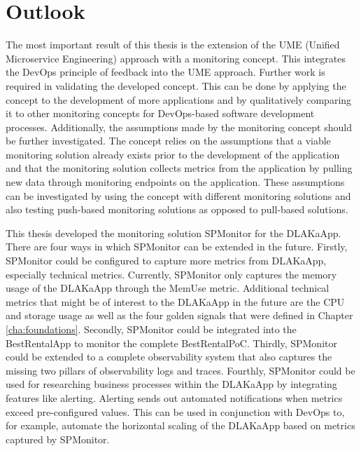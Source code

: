 \section{Outlook}
\label{sec:outlook}

The most important result of this thesis is the extension of the UME (Unified Microservice Engineering)
approach with a monitoring concept. This integrates the DevOps principle of feedback
into the UME approach. Further work is required in validating the developed concept.
This can be done by applying the concept to the development of more applications
and by qualitatively comparing it to other monitoring concepts for DevOps-based
software development processes. Additionally, the assumptions made by the monitoring concept
should be further investigated. The concept relies on the assumptions that a viable monitoring
solution already exists prior to the development of the application
and that the monitoring solution collects metrics from the application by pulling new data
through monitoring endpoints on the application. These assumptions can be investigated by
using the concept with different monitoring solutions and also testing push-based monitoring solutions
as opposed to pull-based solutions.

This thesis developed the monitoring solution SPMonitor
for the DLAKaApp. There are four ways in which SPMonitor
can be extended in the future. Firstly, SPMonitor could be configured
to capture more metrics from DLAKaApp, especially technical metrics.
Currently, SPMonitor only captures the memory usage of the DLAKaApp through the
MemUse metric. Additional technical metrics that might be of interest
to the DLAKaApp in the future are the CPU and storage usage as well as the
four golden signals that were defined in Chapter \ref{cha:foundations}.
Secondly, SPMonitor could be integrated into the BestRentalApp to monitor
the complete BestRentalPoC.
Thirdly, SPMonitor could be extended to a complete observability system
that also captures the missing two pillars of observability logs and traces.
Fourthly, SPMonitor could be used for researching business processes within
the DLAKaApp by integrating features like alerting. Alerting sends out
automated notifications when metrics exceed pre-configured values.
This can be used in conjunction with DevOps to, for example,
automate the horizontal scaling of the DLAKaApp based on metrics captured by SPMonitor.